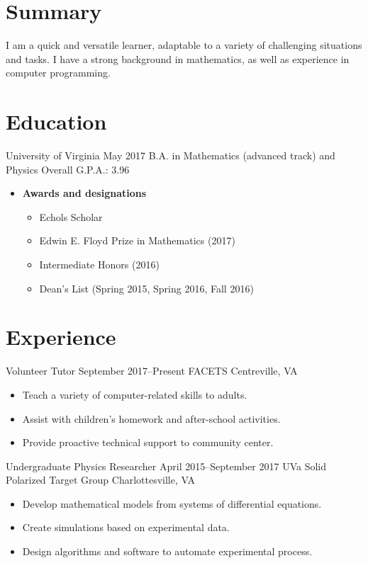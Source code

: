 \documentclass[12pt]{article}
\begin{document}


\section*{Summary}
I am a quick and versatile learner, adaptable to a variety of challenging situations and tasks.
I have a strong background in mathematics, as well as experience in computer programming.

\section*{Education}
\entry
    {University of Virginia}
    {May 2017}
    {B.A. in Mathematics (advanced track) and Physics}
    {Overall G.P.A.: 3.96}
\begin{itemize}
    \item \textbf{Awards and designations}
        \begin{itemize}
            \item Echols Scholar
            \item Edwin E. Floyd Prize in Mathematics (2017)
            \item Intermediate Honors (2016)
            \item Dean's List (Spring 2015, Spring 2016, Fall 2016)
        \end{itemize}
\end{itemize}

\section*{Experience}
\entry
    {Volunteer Tutor}
    {September 2017--Present}
    {FACETS}
    {Centreville, VA}
\begin{itemize}
    \item Teach a variety of computer-related skills to adults.
    \item Assist with children's homework and after-school activities.
    \item Provide proactive technical support to community center.
\end{itemize}

\entry
    {Undergraduate Physics Researcher}
    {April 2015--September 2017}
    {UVa Solid Polarized Target Group}
    {Charlottesville, VA}
\begin{itemize}
    \item Develop mathematical models from systems of differential equations.
    \item Create simulations based on experimental data.
    \item Design algorithms and software to automate experimental process.
\end{itemize}
\end{document}
